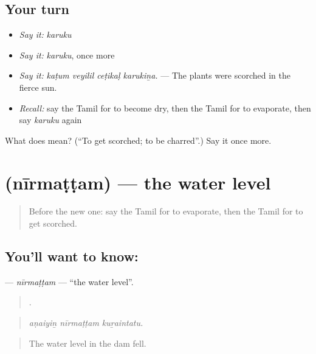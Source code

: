 \subsection*{Your turn}
\begin{itemize}
\raggedright
  \item \emph{Say it:} \emph{karuku}
  \item \emph{Say it:} \emph{karuku}, once more
  \item \emph{Say it:} \emph{kaṭum veyilil ceṭikaḷ karukiṉa.} — The plants were scorched in the fierce sun.
  \item \emph{Recall:} say the Tamil for to become dry, then the Tamil for to evaporate, then say \emph{karuku} again
\end{itemize}

\begin{tcolorbox}[breakable,colback=teal!4,colframe=teal!35!black,title={Before you move on}]
What does  mean? (\textquotedblleft{}To get scorched; to be charred\textquotedblright{}.) Say it once more.
\end{tcolorbox}
\section[\texorpdfstring{\ta{நீர்மட்டம்} (nīrmaṭṭam)}{நீர்மட்டம் (nīrmaṭṭam)}]{ (nīrmaṭṭam) — the water level}

\label{lesson:TA-C431-nirmattam}



\begin{quote}
Before the new one: say the Tamil for to evaporate, then the Tamil for to get scorched.
\end{quote}

\subsection*{You'll want to know: }
\textbf{} — \emph{nīrmaṭṭam} — \textquotedblleft{}the water level\textquotedblright{}.

\begin{quote}
  .
\end{quote}

\begin{quote}
\emph{aṇaiyiṉ nīrmaṭṭam kuṟaintatu.}
\end{quote}

\begin{quote}
The water level in the dam fell.
\end{quote}

